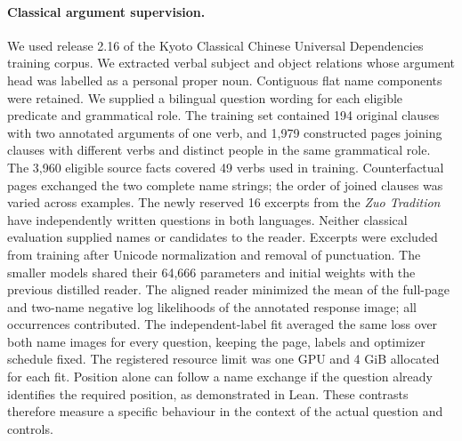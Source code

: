 \documentclass[12pt,a4paper]{article}
\providecommand{\DIFadd}[1]{{\protect\color{blue} \sf #1}} %
\begin{document}
\paragraph{\DIFadd{Classical argument supervision.}}
\DIFadd{We used release 2.16 of the Kyoto Classical Chinese Universal Dependencies training corpus. We extracted verbal subject and object relations whose argument head was labelled as a personal proper noun. Contiguous flat name components were retained. We supplied a bilingual question wording for each eligible predicate and grammatical role. The training set contained 194 original clauses with two annotated arguments of one verb, and 1,979 constructed pages joining clauses with different verbs and distinct people in the same grammatical role. The 3,960 eligible source facts covered 49 verbs used in training. Counterfactual pages exchanged the two complete name strings; the order of joined clauses was varied across examples. The newly reserved 16 excerpts from the \textit{Zuo Tradition} have independently written questions in both languages. Neither classical evaluation supplied names or candidates to the reader. Excerpts were excluded from training after Unicode normalization and removal of punctuation. The smaller models shared their 64,666 parameters and initial weights with the previous distilled reader. The aligned reader minimized the mean of the full-page and two-name negative log likelihoods of the annotated response image; all occurrences contributed. The independent-label fit averaged the same loss over both name images for every question, keeping the page, labels and optimizer schedule fixed. The registered resource limit was one GPU and 4 GiB allocated for each fit. Position alone can follow a name exchange if the question already identifies the required position, as demonstrated in Lean. These contrasts therefore measure a specific behaviour in the context of the actual question and controls.
}
\end{document}
